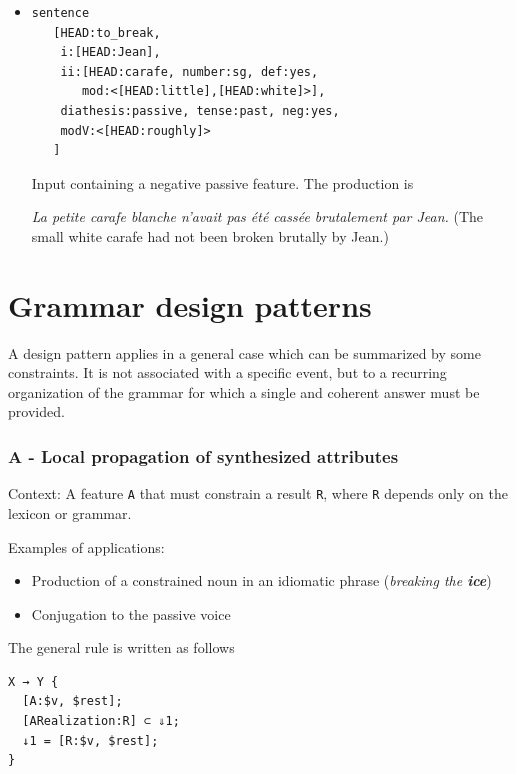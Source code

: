 \documentclass[11pt]{article}
\begin{document}
\begin{itemize}
	      \begin{exe}
		      \ex \textit{Jean prend une belle initiative.}  (Jean takes a fine initiative)
	      \end{exe}

	\item
	      \begin{verbatim}
sentence 
   [HEAD:to_break,
    i:[HEAD:Jean], 
    ii:[HEAD:carafe, number:sg, def:yes, 
       mod:<[HEAD:little],[HEAD:white]>], 
    diathesis:passive, tense:past, neg:yes, 
    modV:<[HEAD:roughly]>
   ]
\end{verbatim}

	      Input containing a negative passive feature. The
	      production is
	      \begin{exe}
		      \ex \textit{La petite carafe blanche n'avait pas été cassée
			      brutalement par Jean.} (The small white carafe had not been broken
		      brutally by Jean.)
	      \end{exe}

\end{itemize}

\section{Grammar design patterns}

A design pattern applies in a general case which can be summarized by
some constraints. It is not associated with a specific event, but to a
recurring organization of the grammar for which a single and coherent
answer must be provided.

\subsubsection*{A - Local propagation of synthesized attributes}

Context:
A feature \texttt{A} that must constrain a result \texttt{R}, where
\texttt{R} depends only on the lexicon or grammar.

Examples of applications:
\begin{itemize}
	\item Production of a constrained noun in an idiomatic phrase
	      (\textit{breaking the \textbf{ice}})
	\item Conjugation to the passive voice
\end{itemize}

The general rule is written as follows

\begin{lstlisting}
X → Y {
  [A:$v, $rest];
  [ARealization:R] ⊂ ⇓1;
  ↓1 = [R:$v, $rest];
}
\end{lstlisting}
\end{document}
